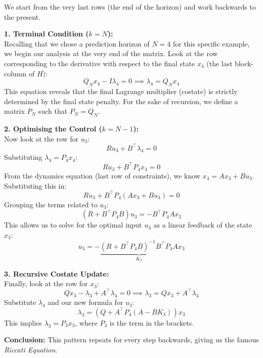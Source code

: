 We start from the very last rows (the end of the horizon) and work backwards to the present.

\textbf{1. Terminal Condition ($k=N$):} \\
Recalling that we chose a prediction horizon of $N=4$ for this specific example, we begin our analysis at the very end of the matrix. Look at the row corresponding to the derivative with respect to the final state $x_4$ (the last block-column of $H$):
\[ 
Q_N x_4 - I \lambda_4 = 0 \implies \lambda_4 = Q_N x_4 
\]
This equation reveals that the final Lagrange multiplier (costate) is strictly determined by the final state penalty. For the sake of recursion, we define a matrix $P_N$ such that $P_N = Q_N$.

\textbf{2. Optimising the Control ($k=N-1$):} \\
Now look at the row for $u_3$:
\[ R u_3 + B^\top \lambda_4 = 0 \]
Substituting $\lambda_4 = P_4 x_4$:
\[ R u_3 + B^\top P_4 x_4 = 0 \]
From the dynamics equation (last row of constraints), we know $x_4 = A x_3 + B u_3$. Substituting this in:
\[ R u_3 + B^\top P_4 (A x_3 + B u_3) = 0 \]
Grouping the terms related to $u_3$:
\[ (R + B^\top P_4 B) u_3 = - B^\top P_4 A x_3 \]
This allows us to solve for the optimal input $u_3$ as a linear feedback of the state $x_3$:
\begin{equation*}
	u_3 = -\underbrace{(R + B^\top P_4 B)^{-1} B^\top P_4 A}_{K_3} x_3
\end{equation*}

\textbf{3. Recursive Costate Update:} \\
Finally, look at the row for $x_3$:
\[ Q x_3 - \lambda_3 + A^\top \lambda_4 = 0 \implies \lambda_3 = Q x_3 + A^\top \lambda_4 \]
Substitute $\lambda_4$ and our new formula for $u_3$:
\[ \lambda_3 = (Q + A^\top P_4 (A - B K_3)) x_3 \]
This implies $\lambda_3 = P_3 x_3$, where $P_3$ is the term in the brackets.

\textbf{Conclusion:}
This pattern repeats for every step backwards, giving us the famous \emph{Riccati Equation}.

